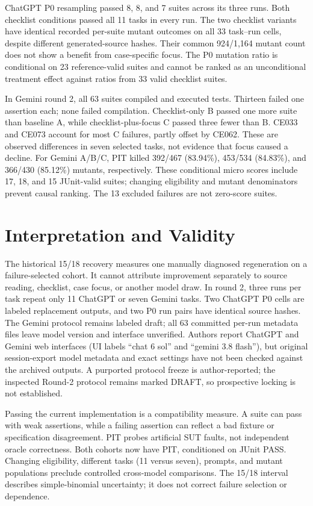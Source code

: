 \documentclass[conference]{IEEEtran}
\begin{document}
ChatGPT P0 resampling passed 8, 8, and 7 suites across its three runs. Both checklist conditions passed all 11 tasks in every run. The two checklist variants have identical recorded per-suite mutant outcomes on all 33 task--run cells, despite different generated-source hashes. Their common 924/1,164 mutant count does not show a benefit from case-specific focus. The P0 mutation ratio is conditional on 23 reference-valid suites and cannot be ranked as an unconditional treatment effect against ratios from 33 valid checklist suites.

In Gemini round 2, all 63 suites compiled and executed tests. Thirteen failed one assertion each; none failed compilation. Checklist-only B passed one more suite than baseline A, while checklist-plus-focus C passed three fewer than B. CE033 and CE073 account for most C failures, partly offset by CE062. These are observed differences in seven selected tasks, not evidence that focus caused a decline. For Gemini A/B/C, PIT killed 392/467 (83.94\%), 453/534 (84.83\%), and 366/430 (85.12\%) mutants, respectively. These conditional micro scores include 17, 18, and 15 JUnit-valid suites; changing eligibility and mutant denominators prevent causal ranking. The 13 excluded failures are not zero-score suites.
\section{Interpretation and Validity}
The historical 15/18 recovery measures one manually diagnosed regeneration on a failure-selected cohort. It cannot attribute improvement separately to source reading, checklist, case focus, or another model draw. In round 2, three runs per task repeat only 11 ChatGPT or seven Gemini tasks. Two ChatGPT P0 cells are labeled replacement outputs, and two P0 run pairs have identical source hashes. The Gemini protocol remains labeled draft; all 63 committed per-run metadata files leave model version and interface unverified. Authors report ChatGPT and Gemini web interfaces (UI labels ``chat 6 sol'' and ``gemini 3.8 flash''), but original session-export model metadata and exact settings have not been checked against the archived outputs. A purported protocol freeze is author-reported; the inspected Round-2 protocol remains marked DRAFT, so prospective locking is not established.

Passing the current implementation is a compatibility measure. A suite can pass with weak assertions, while a failing assertion can reflect a bad fixture or specification disagreement. PIT probes artificial SUT faults, not independent oracle correctness. Both cohorts now have PIT, conditioned on JUnit PASS. Changing eligibility, different tasks (11 versus seven), prompts, and mutant populations preclude controlled cross-model comparisons. The 15/18 interval describes simple-binomial uncertainty; it does not correct failure selection or dependence.
\end{document}
